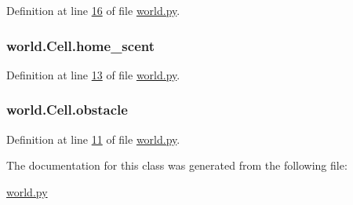 Definition at line \hyperlink{world_8py_source_l00016}{16} of file \hyperlink{world_8py_source}{world.\+py}.

\hypertarget{classworld_1_1Cell_a0ef4adaadea1ccdcd1b61c70e242aa4a}{
\subsubsection[{home\+\_\+scent}]{\setlength{\rightskip}{0pt plus 5cm}world.\+Cell.\+home\+\_\+scent}}\label{classworld_1_1Cell_a0ef4adaadea1ccdcd1b61c70e242aa4a}


Definition at line \hyperlink{world_8py_source_l00013}{13} of file \hyperlink{world_8py_source}{world.\+py}.

\hypertarget{classworld_1_1Cell_aeaf17388b8c9000fe612ab043418825c}{
\subsubsection[{obstacle}]{\setlength{\rightskip}{0pt plus 5cm}world.\+Cell.\+obstacle}}\label{classworld_1_1Cell_aeaf17388b8c9000fe612ab043418825c}


Definition at line \hyperlink{world_8py_source_l00011}{11} of file \hyperlink{world_8py_source}{world.\+py}.



The documentation for this class was generated from the following file\+:\begin{DoxyCompactItemize}
\item 
\hyperlink{world_8py}{world.\+py}\end{DoxyCompactItemize}
